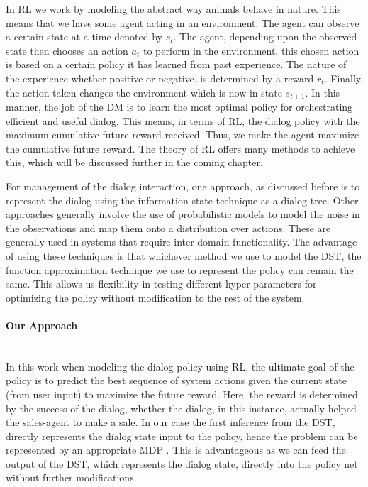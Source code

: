 \documentclass[12pt]{extarticle}
\newcommand{\myparagraph}[1]{\paragraph{#1}\mbox{}\\ \linebreak}
\numberwithin{equation}{section}
\begin{document}
	In RL we work by modeling the abstract way animals behave in nature. This means that we have some agent acting in an environment. The agent can observe a certain state at a time denoted by $s_t$. The agent, depending upon the observed state then chooses an action $a_t$ to perform in the environment, this chosen action is based on a certain policy it has learned from past experience. The nature of the experience whether positive or negative, is determined by a reward $r_t$. Finally, the action taken changes the environment which is now in state $s_{t+1}$. In this manner, the job of the DM is to learn the most optimal policy for orchestrating efficient and useful dialog. This means, in terms of RL, the dialog policy with the maximum cumulative future reward received. Thus, we make the agent maximize the cumulative future reward. The theory of RL \cite{Sutton-introRL} offers many methods to achieve this\cite{DBLP:journals/corr/abs-1711-01731}, which will be discussed further in the coming chapter. \par
	For management of the dialog interaction, one approach, as discussed before is to represent the dialog using the information state technique as a dialog tree. Other approaches generally involve the use of probabilistic models to model the noise in the observations and map them onto a distribution over actions. These are generally used in systems that require inter-domain functionality\cite{henderson_interdomain}. The advantage of using these techniques is that whichever method we use to model the DST, the function approximation technique we use to represent the policy can remain the same. This allows us flexibility in testing different hyper-parameters for optimizing the policy without modification to the rest of the system.
	\myparagraph{Our Approach}
	In this work when modeling the dialog policy using RL, the ultimate goal of the policy is to predict the best sequence of system actions given the current  state (from user input) to maximize the future reward.
	Here, the reward is determined by the success of the dialog, whether the dialog, in this instance, actually helped the sales-agent to make a sale. In our case the first inference from the DST, directly represents the dialog state input to the policy, hence the problem can be represented by an appropriate MDP \cite{mdp-pieraccini}. This is advantageous as we can feed the output of the DST, which represents the dialog state, directly into the policy net without further modifications.
\end{document}
